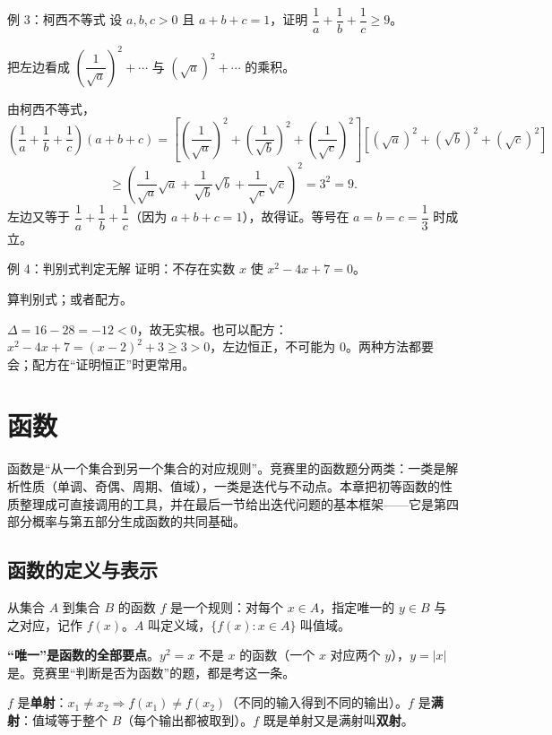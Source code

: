 \begin{problem}{例 3：柯西不等式}
设 $a,b,c>0$ 且 $a+b+c=1$，证明 $\dfrac1a+\dfrac1b+\dfrac1c\ge9$。
\end{problem}
\hint 把左边看成 $\left(\dfrac1{\sqrt a}\right)^2+\cdots$ 与 $(\sqrt a)^2+\cdots$ 的乘积。

\sol 由柯西不等式，
\[
\left(\frac1a+\frac1b+\frac1c\right)(a+b+c)
=\left[\left(\frac1{\sqrt a}\right)^2+\left(\frac1{\sqrt b}\right)^2+\left(\frac1{\sqrt c}\right)^2\right]
 \left[(\sqrt a)^2+(\sqrt b)^2+(\sqrt c)^2\right]
\]
\[
\ge\left(\frac1{\sqrt a}\sqrt a+\frac1{\sqrt b}\sqrt b+\frac1{\sqrt c}\sqrt c\right)^2=3^2=9.
\]
左边又等于 $\dfrac1a+\dfrac1b+\dfrac1c$（因为 $a+b+c=1$），故得证。等号在 $a=b=c=\dfrac13$ 时成立。

\begin{problem}{例 4：判别式判定无解}
证明：不存在实数 $x$ 使 $x^2-4x+7=0$。
\end{problem}
\hint 算判别式；或者配方。

\sol $\Delta=16-28=-12<0$，故无实根。也可以配方：$x^2-4x+7=(x-2)^2+3\ge3>0$，左边恒正，不可能为 $0$。两种方法都要会；配方在“证明恒正”时更常用。

\chapter{函数}
\begin{chapterintro}[章节导读]
函数是“从一个集合到另一个集合的对应规则”。竞赛里的函数题分两类：一类是解析性质（单调、奇偶、周期、值域），一类是迭代与不动点。本章把初等函数的性质整理成可直接调用的工具，并在最后一节给出迭代问题的基本框架——它是第四部分概率与第五部分生成函数的共同基础。
\end{chapterintro}

\section{函数的定义与表示}
\begin{definition}[函数]
从集合 $A$ 到集合 $B$ 的函数 $f$ 是一个规则：对每个 $x\in A$，指定唯一的 $y\in B$ 与之对应，记作 $f(x)$。$A$ 叫定义域，$\{f(x):x\in A\}$ 叫值域。
\end{definition}
\textbf{“唯一”是函数的全部要点}。$y^2=x$ 不是 $x$ 的函数（一个 $x$ 对应两个 $y$），$y=|x|$ 是。竞赛里“判断是否为函数”的题，都是考这一条。

\begin{definition}[单射、满射、双射]
$f$ 是\textbf{单射}：$x_1\ne x_2\Rightarrow f(x_1)\ne f(x_2)$（不同的输入得到不同的输出）。$f$ 是\textbf{满射}：值域等于整个 $B$（每个输出都被取到）。$f$ 既是单射又是满射叫\textbf{双射}。
\end{definition}

